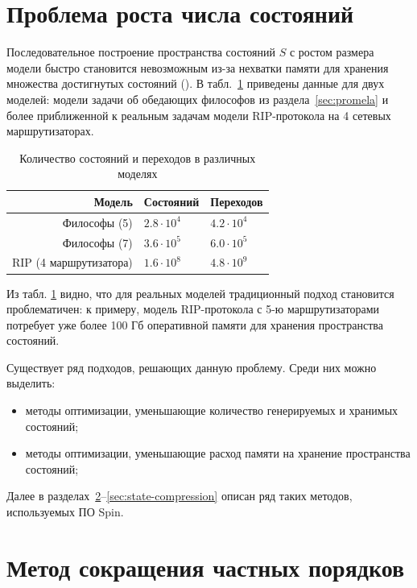 \section{Проблема роста числа состояний}
\label{sec:state-explosion}

Последовательное построение пространства состояний $S$ с ростом размера модели быстро
становится невозможным из-за нехватки памяти для хранения множества достигнутых состояний
(). В табл.~\ref{tab:models-statecount} приведены данные для двух моделей:
модели задачи об обедающих философов из раздела~\ref{sec:promela} и более приближенной к
реальным задачам модели RIP-протокола на 4 сетевых маршрутизаторах.

\begin{table}
  \centering
  \begin{tabular}{|r|l|l|}
    \hline
    Модель                  & Состояний         & Переходов       \\
    \hline
    Философы (5)            & $2.8 \cdot 10^4$  & $4.2 \cdot 10^4$ \\
    Философы (7)            & $3.6 \cdot 10^5$  & $6.0 \cdot 10^5$ \\
    RIP (4 маршрутизатора)  & $1.6 \cdot 10^8$  & $4.8 \cdot 10^9$ \\
    \hline
  \end{tabular}
  \caption{Количество состояний и переходов в различных моделях}
\label{tab:models-statecount}
\end{table}

Из табл. \ref{tab:models-statecount} видно, что для реальных моделей традиционный подход
становится проблематичен: к примеру, модель RIP-протокола с 5-ю маршрутизаторами потребует
уже более 100 Гб оперативной памяти для хранения пространства состояний.

Существует ряд подходов, решающих данную проблему. Среди них можно выделить:

\begin{itemize}
\item методы оптимизации, уменьшающие количество генерируемых и хранимых состояний;
\item методы оптимизации, уменьшающие расход памяти на хранение пространства состояний;
\end{itemize}

Далее в разделах~\ref{sec:partial-order-reduction}--\ref{sec:state-compression} описан ряд
таких методов, используемых ПО Spin.

\section{Метод сокращения частных порядков}
\label{sec:partial-order-reduction}

